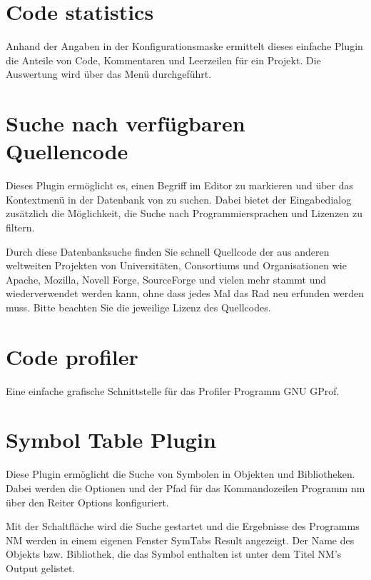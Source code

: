 \section{Code statistics}


Anhand der Angaben in der Konfigurationsmaske ermittelt dieses einfache Plugin die Anteile von Code, Kommentaren und Leerzeilen für ein Projekt. Die Auswertung wird über das Menü  durchgeführt.

\section{Suche nach verfügbaren Quellencode}

Dieses Plugin ermöglicht es, einen Begriff im Editor zu markieren und über das Kontextmenü  in der Datenbank von \cite{url:koders} zu suchen. Dabei bietet der Eingabedialog zusätzlich die Möglichkeit, die Suche nach Programmiersprachen und Lizenzen zu filtern.

Durch diese Datenbanksuche finden Sie schnell Quellcode der aus anderen weltweiten Projekten von Universitäten, Consortiums und Organisationen wie Apache, Mozilla, Novell Forge, SourceForge und vielen mehr stammt und wiederverwendet werden kann, ohne dass jedes Mal das Rad neu erfunden werden muss. Bitte beachten Sie die jeweilige Lizenz des Quellcodes.

\section{Code profiler}

Eine einfache grafische Schnittstelle für das Profiler Programm GNU GProf.

\section{Symbol Table Plugin}

Diese Plugin ermöglicht die Suche von Symbolen in Objekten und Bibliotheken. Dabei werden die Optionen und der Pfad für das Kommandozeilen Programm nm über den Reiter Options konfiguriert.


Mit der Schaltfläche  wird die Suche gestartet und die Ergebnisse des Programms NM werden in einem eigenen Fenster SymTabs Result angezeigt. Der Name des Objekts bzw. Bibliothek, die das Symbol enthalten ist unter dem Titel NM's Output gelistet.

